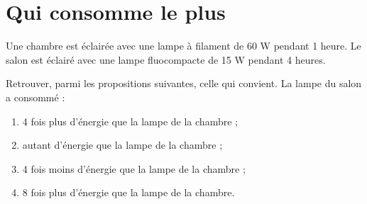 \section{Qui consomme le plus}

Une chambre est éclairée avec une lampe à filament de 60 W pendant 1 heure. Le salon est éclairé avec une lampe fluocompacte de 15 W pendant 4 heures.


\begin{questions}
	\question Retrouver, parmi les propositions suivantes, celle qui convient.
	La lampe du salon a consommé :
	\begin{enumerate}
		\item 4 fois plus d'énergie que la lampe de la chambre ;
		\item autant d'énergie que la lampe de la chambre ;
		\item 4 fois moins d'énergie que la lampe de la chambre ;
		\item 8 fois plus d'énergie que la lampe de la chambre.
	\end{enumerate}

	\fillwithdottedlines{3cm}
\end{questions}
